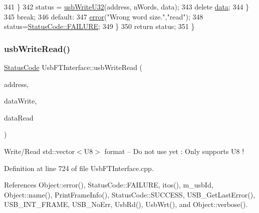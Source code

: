 \begin{DoxyCode}
341       \}
342       status = \hyperlink{classUsbFTInterface_ac5eac42e444c9b0f19f0f70598c51b20}{usbWriteU32}(address, nWords, data);
343       \textcolor{keyword}{delete} \hyperlink{namespaceshell_a5ea2525995cedc3efd69ea8a7f034d1e}{data};
344     \}
345     \textcolor{keywordflow}{break};
346   \textcolor{keywordflow}{default}:
347     \hyperlink{classObject_a204a95f57818c0f811933917a30eff45}{error}(\textcolor{stringliteral}{"Wrong word size."},\textcolor{stringliteral}{"read"});
348     status=\hyperlink{classStatusCode_a6f565cbeadc76d14c72f047e5e85eb4ba3da73d4c469762eb9d3c960368252b26}{StatusCode::FAILURE};
349   \}
350   \textcolor{keywordflow}{return} status;
351 \}
\end{DoxyCode}
\mbox{\label{classUsbFTInterface_aa477927996bd05aeee185c192ef9a68e}} 
\subsubsection{\texorpdfstring{usb\+Write\+Read()}{usbWriteRead()}}
{\footnotesize\ttfamily \hyperlink{classStatusCode}{Status\+Code} Usb\+F\+T\+Interface\+::usb\+Write\+Read (\begin{DoxyParamCaption}\item[{unsigned long int}]{address,  }\item[{std\+::vector$<$ \hyperlink{classUsbFTInterface_a3b007566f8af758984d97ada2b9938d3}{U8} $>$}]{data\+Write,  }\item[{std\+::vector$<$ \hyperlink{classUsbFTInterface_a3b007566f8af758984d97ada2b9938d3}{U8} $>$ \&}]{data\+Read }\end{DoxyParamCaption})}

Write/\+Read std\+::vector$<$\+U8$>$ format -- Do not use yet \+: Only supports U8 ! 

Definition at line 724 of file Usb\+F\+T\+Interface.\+cpp.



References Object\+::error(), Status\+Code\+::\+F\+A\+I\+L\+U\+RE, itos(), m\+\_\+usb\+Id, Object\+::name(), Print\+Frame\+Info(), Status\+Code\+::\+S\+U\+C\+C\+E\+SS, U\+S\+B\+\_\+\+Get\+Last\+Error(), U\+S\+B\+\_\+\+I\+N\+T\+\_\+\+F\+R\+A\+ME, U\+S\+B\+\_\+\+No\+Err, Usb\+Rd(), Usb\+Wrt(), and Object\+::verbose().



